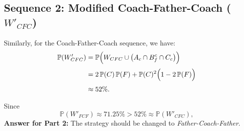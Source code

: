 \documentclass[12pt]{article}
\begin{document}
\subsection*{Sequence 2: Modified Coach-Father-Coach ($W'_{CFC}$)}
Similarly, for the Coach-Father-Coach sequence, we have:
\[
\begin{aligned}
\mathbb{P}(W'_{CFC}) &= \mathbb{P}\Big(W_{CFC} \cup \bigl(A_c \cap B_f^c \cap C_c\bigr)\Big)\\[1mm]
&= 2\,\mathbb{P}(C)\,\mathbb{P}(F) + \mathbb{P}(C)^2\Bigl(1-2\,\mathbb{P}(F)\Bigr)\\[1mm]
&\approx 52\%.
\end{aligned}
\]

Since
\[
\mathbb{P}(W'_{FCF}) \approx 71.25\% > 52\% \approx \mathbb{P}(W'_{CFC}),
\]
\textbf{Answer for Part 2:} The strategy should be changed to \emph{Father-Coach-Father}.
\end{document}
